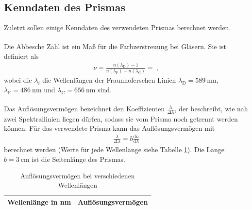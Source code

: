 \subsection{Kenndaten des Prismas}
Zuletzt sollen einige Kenndaten des verwendeten Prismas berechnet werden. \\
\ \\
Die Abbesche Zahl ist ein Maß für die Farbzerstreuung bei Gläsern. Sie ist definiert als
\begin{align}
	\nu = \frac{n(\lambda_\text{D})-1}{n(\lambda_\text{F})-n(\lambda_\text{C})} =  \ ,
\end{align}
wobei die $\lambda_i$ die Wellenlängen der Fraunhoferschen Linien $\lambda_\text{D} = \SI{589}{\nano\meter}$, $\lambda_\text{F} = \SI{486}{\nano\meter}$ und $\lambda_\text{C} = \SI{656}{\nano\meter}$ sind. \\
\ \\
Das Auflösungsvermögen bezeichnet den Koeffizienten $\frac{\lambda}{\Delta\lambda}$, der beschreibt, wie nah zwei Spektrallinien liegen dürfen, sodass sie vom Prisma noch getrennt werden können. Für das verwendete Prisma kann das Auflösungsvermögen mit
\begin{align*}
	\frac{\lambda}{\Delta\lambda} = b\frac{\text{d}n}{\text{d}\lambda}
\end{align*}
berechnet werden (Werte für jede Wellenlänge siehe Tabelle \ref{tab:Aufl}). Die Länge $b=\SI{3}{\centi\meter}$ ist die Seitenlänge des Prismas.
\begin{table}[h!]
	\centering
	\begin{tabular}{c|c}
		Wellenlänge in \si{\nano\meter} & Auflösungsvermögen \\
		\hline
		
	\end{tabular}
	\caption{Auflösungsvermögen bei verschiedenen Wellenlängen}
	\label{tab:Aufl}
\end{table}

